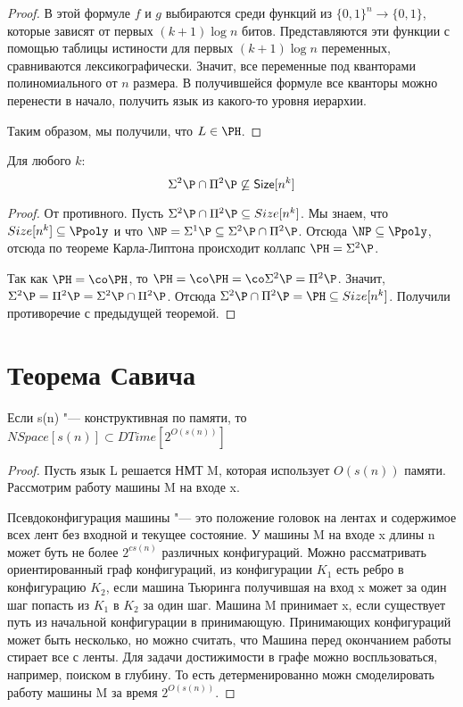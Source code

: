 \begin{proof}
	В этой формуле $f$ и $g$ выбираются среди функций из $\{0, 1\}^n \to \{0, 1\}$, которые
	зависят от первых $(k + 1)\log n$ битов.
	Представляются эти  функции с помощью таблицы истиности для первых $(k + 1)\log n$ переменных,
	сравниваются лексикографически.
	Значит, все переменные под кванторами полиномиального от $n$ размера.
	В получившейся формуле все кванторы можно перенести в начало, получить
	язык из какого-то уровня иерархии.

	Таким образом, мы получили, что $L \in \PH$.
\end{proof}

\begin{conseq}
	Для любого $k$:
	\[ \Sigma^2 \P \cap \Pi^2 \P \not\subseteq \mathsf{Size}[n^k] \]
\end{conseq}
\begin{proof}
	От противного.
	Пусть $\Sigma^2 \P \cap \Pi^2 \P \subseteq Size[n^k]$.
	Мы знаем, что $Size[n^k] \subseteq \Ppoly$ и
	что $\NP = \Sigma^1 \P \subseteq \Sigma^2 \P \cap \Pi^2 \P$.
	Отсюда $\NP \subseteq \Ppoly$, отсюда по теореме Карла-Липтона происходит
	коллапс $\PH = \Sigma^2 \P$.

	Так как $\PH=\co\PH$, то $\PH=\co\PH=\co\Sigma^2\P=\Pi^2\P$.
	Значит, $\Sigma^2\P=\Pi^2\P=\Sigma^2\P\cap\Pi^2\P$.
	Отсюда $\Sigma^2 \P \cap \Pi^2 \P = \PH \subseteq Size[n^k]$.
	Получили противоречие с предыдущей теоремой.
\end{proof}

\section{Теорема Савича}
\begin{theorem}
	Если s(n) "--- конструктивная по памяти, то 
	$NSpace[s(n)] \subset DTime[2^{O(s(n))}]$
\end{theorem}
\begin{proof}
	Пусть язык L решается НМТ M, которая использует $O(s(n))$ памяти. 
	Рассмотрим работу машины M на входе x. 

	Псевдоконфигурация машины "--- это положение головок на лентах 
	и содержимое всех лент без входной и текущее состояние. У машины 
	M на входе x длины n может буть не более $2^{cs(n)}$ различных
	конфигураций.  Можно рассматривать ориентированный граф конфигураций, 
	из конфигурации $K_1$ есть ребро в конфигурацию $K_2$, если машина 
	Тьюринга получившая на вход x может за один шаг попасть из $K_1$ в 
	$K_2$ за один шаг. Машина M принимает x, если существует путь из
	начальной конфигурации в принимающую. Принимающих конфигураций
	может быть несколько, но можно считать, что Машина перед окончанием работы
	стирает все с ленты. Для задачи достижимости в графе можно воспльзоваться,
	например, поиском в глубину. То есть детерменированно
	можн смоделировать работу машины M за время $2^{O(s(n))}$.
\end{proof}

